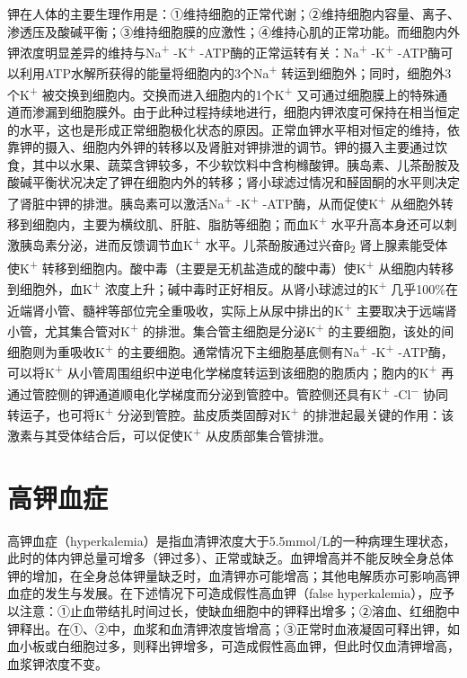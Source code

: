 钾在人体的主要生理作用是：①维持细胞的正常代谢；②维持细胞内容量、离子、渗透压及酸碱平衡；③维持细胞膜的应激性；④维持心肌的正常功能。而细胞内外钾浓度明显差异的维持与Na\textsuperscript{+}
-K\textsuperscript{+} -ATP酶的正常运转有关：Na\textsuperscript{+}
-K\textsuperscript{+}
-ATP酶可以利用ATP水解所获得的能量将细胞内的3个Na\textsuperscript{+}
转运到细胞外；同时，细胞外3个K\textsuperscript{+}
被交换到细胞内。交换而进入细胞内的1个K\textsuperscript{+}
又可通过细胞膜上的特殊通道而渗漏到细胞膜外。由于此种过程持续地进行，细胞内钾浓度可保持在相当恒定的水平，这也是形成正常细胞极化状态的原因。正常血钾水平相对恒定的维持，依靠钾的摄入、细胞内外钾的转移以及肾脏对钾排泄的调节。钾的摄入主要通过饮食，其中以水果、蔬菜含钾较多，不少软饮料中含枸橼酸钾。胰岛素、儿茶酚胺及酸碱平衡状况决定了钾在细胞内外的转移；肾小球滤过情况和醛固酮的水平则决定了肾脏中钾的排泄。胰岛素可以激活Na\textsuperscript{+}
-K\textsuperscript{+} -ATP酶，从而促使K\textsuperscript{+}
从细胞外转移到细胞内，主要为横纹肌、肝脏、脂肪等细胞；而血K\textsuperscript{+}
水平升高本身还可以刺激胰岛素分泌，进而反馈调节血K\textsuperscript{+}
水平。儿茶酚胺通过兴奋β\textsubscript{2}
肾上腺素能受体使K\textsuperscript{+}
转移到细胞内。酸中毒（主要是无机盐造成的酸中毒）使K\textsuperscript{+}
从细胞内转移到细胞外，血K\textsuperscript{+}
浓度上升；碱中毒时正好相反。从肾小球滤过的K\textsuperscript{+}
几乎100\%在近端肾小管、髓袢等部位完全重吸收，实际上从尿中排出的K\textsuperscript{+}
主要取决于远端肾小管，尤其集合管对K\textsuperscript{+}
的排泄。集合管主细胞是分泌K\textsuperscript{+}
的主要细胞，该处的间细胞则为重吸收K\textsuperscript{+}
的主要细胞。通常情况下主细胞基底侧有Na\textsuperscript{+}
-K\textsuperscript{+} -ATP酶，可以将K\textsuperscript{+}
从小管周围组织中逆电化学梯度转运到该细胞的胞质内；胞内的K\textsuperscript{+}
再通过管腔侧的钾通道顺电化学梯度而分泌到管腔中。管腔侧还具有K\textsuperscript{+}
-Cl\textsuperscript{−} 协同转运子，也可将K\textsuperscript{+}
分泌到管腔。盐皮质类固醇对K\textsuperscript{+}
的排泄起最关键的作用：该激素与其受体结合后，可以促使K\textsuperscript{+}
从皮质部集合管排泄。

\section{高钾血症}

高钾血症（hyperkalemia）是指血清钾浓度大于5.5mmol/L的一种病理生理状态，此时的体内钾总量可增多（钾过多）、正常或缺乏。血钾增高并不能反映全身总体钾的增加，在全身总体钾量缺乏时，血清钾亦可能增高；其他电解质亦可影响高钾血症的发生与发展。在下述情况下可造成假性高血钾（false
hyperkalemia），应予以注意：①止血带结扎时间过长，使缺血细胞中的钾释出增多；②溶血、红细胞中钾释出。在①、②中，血浆和血清钾浓度皆增高；③正常时血液凝固可释出钾，如血小板或白细胞过多，则释出钾增多，可造成假性高血钾，但此时仅血清钾增高，血浆钾浓度不变。

